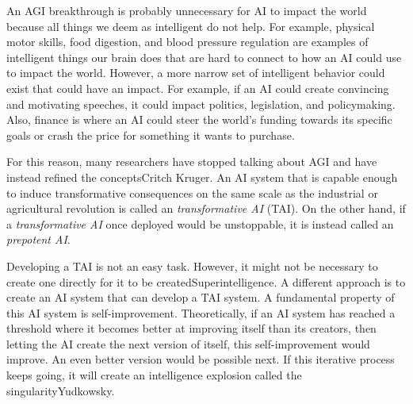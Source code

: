 \documentclass[12pt,A4]{report}
\newcommand{\autobaj}{}
\theoremstyle{definition}
\begin{document}
An AGI breakthrough is probably unnecessary for AI to impact the world because all things we deem as intelligent do not help. For example, physical motor skills, food digestion, and blood pressure regulation are examples of intelligent things our brain does that are hard to connect to how an AI could use to impact the world. However, a more narrow set of intelligent behavior could exist that could have an impact. For example, if an AI could create convincing and motivating speeches, it could impact politics, legislation, and policymaking. Also, finance is where an AI could steer the world's funding towards its specific goals or crash the price for something it wants to purchase. 

For this reason, many researchers have stopped talking about AGI and have instead refined the concepts\autobaj{Critch Kruger}. An AI system that is capable enough to induce transformative consequences on the same scale as the industrial or agricultural revolution is called an \textit{transformative AI} (TAI). On the other hand, if a \textit{transformative AI} once deployed would be unstoppable, it is instead called an \textit{prepotent AI}. 

Developing a TAI is not an easy task. However, it might not be necessary to create one directly for it to be created\autobaj{Superintelligence}. A different approach is to create an AI system that can develop a TAI system. A fundamental property of this AI system is self-improvement. Theoretically, if an AI system has reached a threshold where it becomes better at improving itself than its creators, then letting the AI create the next version of itself, this self-improvement would improve. An even better version would be possible next. If this iterative process keeps going, it will create an intelligence explosion called the singularity\autobaj{Yudkowsky}.  
\end{document}
